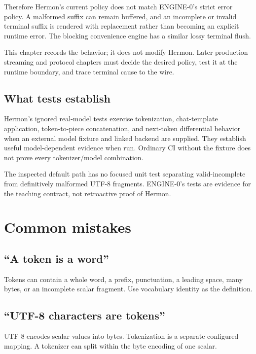 Therefore Hermon's current policy does not match ENGINE-0's strict error
policy. A malformed suffix can remain buffered, and an incomplete or
invalid terminal suffix is rendered with replacement rather than
becoming an explicit runtime error. The blocking convenience engine has
a similar lossy terminal flush.

This chapter records the behavior; it does not modify Hermon. Later
production streaming and protocol chapters must decide the desired
policy, test it at the runtime boundary, and trace terminal cause to the
wire.

\subsection{What tests establish}\label{what-tests-establish}

Hermon's ignored real-model tests exercise tokenization, chat-template
application, token-to-piece concatenation, and next-token differential
behavior when an external model fixture and linked backend are supplied.
They establish useful model-dependent evidence when run. Ordinary CI
without the fixture does not prove every tokenizer/model combination.

The inspected default path has no focused unit test separating
valid-incomplete from definitively malformed UTF-8 fragments. ENGINE-0's
tests are evidence for the teaching contract, not retroactive proof of
Hermon.

\section{Common mistakes}\label{common-mistakes-1}

\subsection{``A token is a word''}\label{a-token-is-a-word}

Tokens can contain a whole word, a prefix, punctuation, a leading space,
many bytes, or an incomplete scalar fragment. Use vocabulary identity as
the definition.

\subsection{``UTF-8 characters are
tokens''}\label{utf-8-characters-are-tokens}

UTF-8 encodes scalar values into bytes. Tokenization is a separate
configured mapping. A tokenizer can split within the byte encoding of
one scalar.

